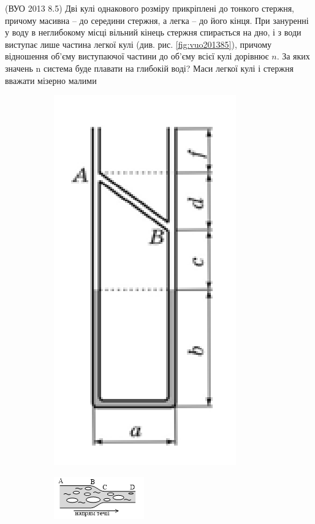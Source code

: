 \begin{problem}{5}
	(ВУО 2013 8.5)
	Дві кулі однакового розміру прикріплені до тонкого стержня, причому масивна –
	до середини стержня, а легка – до його кінця. При зануренні у воду в неглибокому
	місці вільний кінець стержня спирається на
	дно, і з води виступає лише частина легкої
	кулі (див. рис. \ref{fig:vuo201385}), причому відношення об’єму виступаючої частини до об’єму
	всієї кулі дорівнює $n$. За яких значень n система буде плавати на глибокій
	воді? Маси легкої кулі і стержня вважати мізерно малими
	\begin{figure}[h!]
		
		\begin{subfigure}{.4\textwidth}
			\centering
			\includegraphics[width=0.5\linewidth]{class10/vuo_2019_85}
			\caption{}
			\label{fig:vuo201985}
		\end{subfigure}
		\begin{subfigure}{.4\textwidth}
			\centering
			\includegraphics[width=0.5\linewidth]{class10/vuo_2018_83}

\end{subfigure}
\end{figure}
\end{problem}
